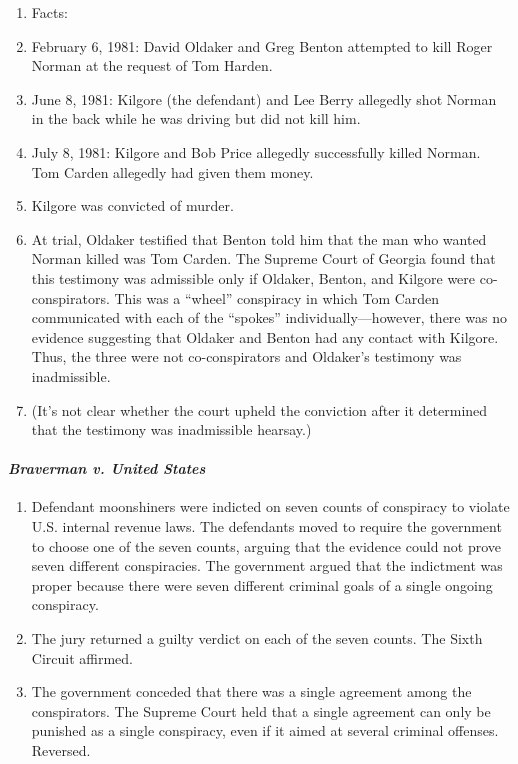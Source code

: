 \begin{enumerate}
    \item Facts:
        \item February 6, 1981: David Oldaker and Greg Benton attempted to kill 
        Roger Norman at the request of Tom Harden.
        \item June 8, 1981: Kilgore (the defendant) and Lee Berry allegedly shot 
        Norman in the back while he was driving but did not kill him.
        \item July 8, 1981: Kilgore and Bob Price allegedly successfully killed 
        Norman. Tom Carden allegedly had given them money.
    \item Kilgore was convicted of murder.
    \item At trial, Oldaker testified that Benton told him that the man who 
    wanted Norman killed was Tom Carden. The Supreme Court of Georgia found 
    that this testimony was admissible only if Oldaker, Benton, and Kilgore 
    were co-conspirators. This was a ``wheel'' conspiracy in which Tom Carden 
    communicated with each of the ``spokes'' individually---however, there was 
    no evidence suggesting that Oldaker and Benton had any contact with 
    Kilgore. Thus, the three were not co-conspirators and Oldaker's testimony 
    was inadmissible.
    \item (It's not clear whether the court upheld the conviction after it 
    determined that the testimony was inadmissible hearsay.)
\end{enumerate}

\paragraph{\emph{Braverman v. United States}}

\begin{enumerate}
    \item Defendant moonshiners were indicted on seven counts of conspiracy to 
    violate U.S. internal revenue laws. The defendants moved to require the 
    government to choose one of the seven counts, arguing that the evidence 
    could not prove seven different conspiracies. The government argued that 
    the indictment was proper because there were seven different criminal 
    goals of a single ongoing conspiracy.
    \item The jury returned a guilty verdict on each of the seven counts. The 
    Sixth Circuit affirmed.
    \item The government conceded that there was a single agreement among the 
    conspirators. The Supreme Court held that a single agreement can only be 
    punished as a single conspiracy, even if it aimed at several criminal 
    offenses. Reversed.
\end{enumerate}

